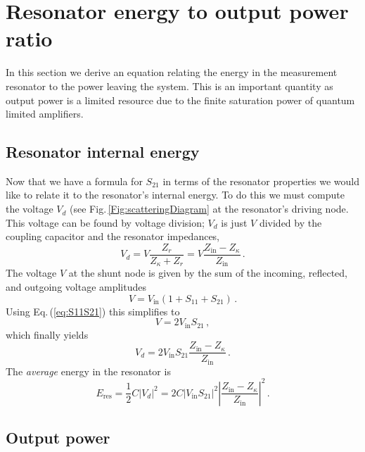 \section{Resonator energy to output power ratio}

In this section we derive an equation relating the energy in the measurement resonator to the power leaving the system. This is an important quantity as output power is a limited resource due to the finite saturation power of quantum limited amplifiers.

\subsection{Resonator internal energy}

Now that we have a formula for $S_{21}$ in terms of the resonator properties we would like to relate it to the resonator's internal energy. To do this we must compute the voltage $V_d$ (see Fig.\,\ref{Fig:scatteringDiagram} at the resonator's driving node. This voltage can be found by voltage division; $V_d$ is just $V$ divided by the coupling capacitor and the resonator impedances, \begin{equation}
V_d = V \frac{Z_r}{Z_{\kappa} + Z_r} = V \frac{Z_{\text{in}}-Z_{\kappa}}{Z_{\text{in}}} \, . \end{equation}
The voltage $V$ at the shunt node is given by the sum of the incoming, reflected, and outgoing voltage amplitudes \begin{equation}
V = V_{\text{in}} \left( 1 + S_{11} + S_{21} \right) \, . \label{eq:VinS} \end{equation}
Using Eq.\,(\ref{eq:S11S21})  this simplifies to \begin{equation}
V = 2 V_{\text{in}} S_{21} \, , \end{equation}
which finally yields \begin{equation}
V_d = 2V_{\text{in}}S_{21} \frac{Z_{\text{in}} - Z_{\kappa}}{Z_{\text{in}}} \, . \end{equation}
The \emph{average} energy in the resonator is
\begin{equation}
E_{\text{res}}=\frac{1}{2}C|V_d|^2 = 2C \left| V_{\text{in}} S_{21} \right|^2 \left| \frac{Z_{\text{in}} - Z_{\kappa}}{Z_{\text{in}}} \right|^2 \, .
\end{equation}

\subsection{Output power}


